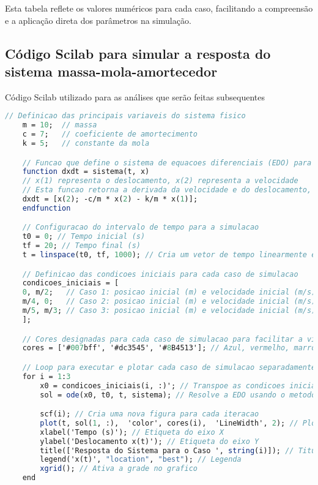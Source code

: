 Esta tabela reflete os valores numéricos para cada caso, facilitando a compreensão e a aplicação direta dos parâmetros na simulação.

\subsection{Código Scilab para simular a resposta do sistema massa-mola-amortecedor}
Código Scilab utilizado para as análises que serão feitas subsequentes
\begin{lstlisting}[language=Scilab, caption=Código Scilab para simular a resposta do sistema massa-mola-amortecedor]
    // Definicao das principais variaveis do sistema fisico
    m = 10;  // massa
    c = 7;   // coeficiente de amortecimento
    k = 5;   // constante da mola

    // Funcao que define o sistema de equacoes diferenciais (EDO) para o modelo massa-mola-amortecedor
    function dxdt = sistema(t, x)
    // x(1) representa o deslocamento, x(2) representa a velocidade
    // Esta funcao retorna a derivada da velocidade e do deslocamento, respectivamente
    dxdt = [x(2); -c/m * x(2) - k/m * x(1)];
    endfunction

    // Configuracao do intervalo de tempo para a simulacao
    t0 = 0; // Tempo inicial (s)
    tf = 20; // Tempo final (s)
    t = linspace(t0, tf, 1000); // Cria um vetor de tempo linearmente espacado para a simulacao

    // Definicao das condicoes iniciais para cada caso de simulacao
    condicoes_iniciais = [
    0, m/2;   // Caso 1: posicao inicial (m) e velocidade inicial (m/s)
    m/4, 0;   // Caso 2: posicao inicial (m) e velocidade inicial (m/s)
    m/5, m/3; // Caso 3: posicao inicial (m) e velocidade inicial (m/s)
    ];

    // Cores designadas para cada caso de simulacao para facilitar a visualizacao
    cores = ['#007bff', '#dc3545', '#8B4513']; // Azul, vermelho, marrom

    // Loop para executar e plotar cada caso de simulacao separadamente
    for i = 1:3
        x0 = condicoes_iniciais(i, :)'; // Transpoe as condicoes iniciais para a formatacao correta
        sol = ode(x0, t0, t, sistema); // Resolve a EDO usando o metodo de ODE

        scf(i); // Cria uma nova figura para cada iteracao
        plot(t, sol(1, :),  'color', cores(i),  'LineWidth', 2); // Plot do deslocamento x(t)
        xlabel('Tempo (s)'); // Etiqueta do eixo X
        ylabel('Deslocamento x(t)'); // Etiqueta do eixo Y
        title(['Resposta do Sistema para o Caso ', string(i)]); // Titulo do grafico
        legend('x(t)', "location", "best"); // Legenda
        xgrid(); // Ativa a grade no grafico
    end


\end{lstlisting}
